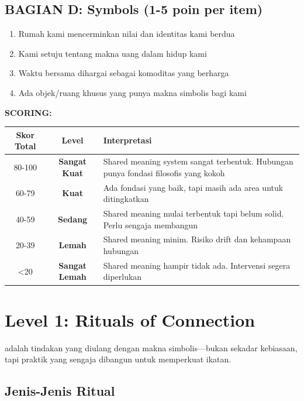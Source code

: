\begin{exercisebox}
\subsection*{BAGIAN D: Symbols (1-5 poin per item)}
\begin{enumerate}
    \item[17.] Rumah kami mencerminkan nilai dan identitas kami berdua
    \item[18.] Kami setuju tentang makna uang dalam hidup kami
    \item[19.] Waktu bersama dihargai sebagai komoditas yang berharga
    \item[20.] Ada objek/ruang khusus yang punya makna simbolis bagi kami
\end{enumerate}

\vspace{0.5cm}
\textbf{SCORING:}

\begin{center}
\renewcommand{\arraystretch}{1.4}
\begin{tabular}{|c|c|p{7cm}|}
\hline
\rowcolor{primary!20}
\textbf{Skor Total} & \textbf{Level} & \textbf{Interpretasi} \\
\hline
80-100 & \textbf{Sangat Kuat} & Shared meaning system sangat terbentuk. Hubungan punya fondasi filosofis yang kokoh \\
\hline
60-79 & \textbf{Kuat} & Ada fondasi yang baik, tapi masih ada area untuk ditingkatkan \\
\hline
40-59 & \textbf{Sedang} & Shared meaning mulai terbentuk tapi belum solid. Perlu sengaja membangun \\
\hline
20-39 & \textbf{Lemah} & Shared meaning minim. Risiko drift dan kehampaan hubungan \\
\hline
\textless 20 & \textbf{Sangat Lemah} & Shared meaning hampir tidak ada. Intervensi segera diperlukan \\
\hline
\end{tabular}
\end{center}
\end{exercisebox}

\section{Level 1: Rituals of Connection}

 adalah tindakan yang diulang dengan makna simbolis---bukan sekadar kebiasaan, tapi praktik yang sengaja dibangun untuk memperkuat ikatan.

\subsection{Jenis-Jenis Ritual}

